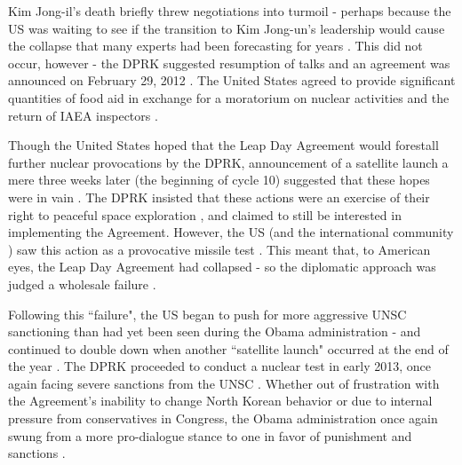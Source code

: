 Kim Jong-il's death briefly threw negotiations into turmoil \cite{crs13} - perhaps because the US was waiting to see if the transition to Kim Jong-un's leadership would cause the collapse that many experts had been forecasting for years \cite{delury}. This did not occur, however - the DPRK suggested resumption of talks and an agreement was announced on February 29, 2012 \cite{delury}. The United States agreed to provide significant quantities of food aid in exchange for a moratorium on nuclear activities and the return of IAEA inspectors \cite{crs13}.

Though the United States hoped that the Leap Day Agreement would forestall further nuclear provocations by the DPRK, announcement of a satellite launch a mere three weeks later (the beginning of cycle 10) suggested that these hopes were in vain \cite{snyder2}. The DPRK insisted that these actions were an exercise of their right to peaceful space exploration \cite{crs13}, and claimed to still be interested in implementing the Agreement. However, the US (and the international community \cite{unsc13}) saw this action as a provocative missile test \cite{davenport}. This meant that, to American eyes, the Leap Day Agreement had collapsed - so the diplomatic approach was judged a wholesale failure \cite{delury}.

Following this ``failure", the US began to push for more aggressive UNSC sanctioning than had yet been seen during the Obama administration - and continued to double down when another ``satellite launch" occurred at the end of the year \cite{crs13}. The DPRK proceeded to conduct a nuclear test in early 2013, once again facing severe sanctions from the UNSC \cite{davenport}. Whether out of frustration with the Agreement's inability to change North Korean behavior or due to internal pressure from conservatives in Congress, the Obama administration once again swung from a more pro-dialogue stance to one in favor of punishment and sanctions \cite{snyder2}.